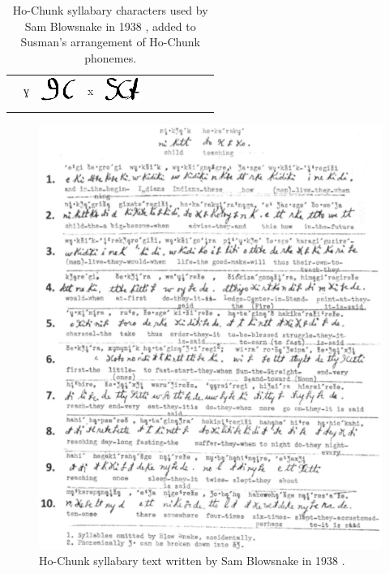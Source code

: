 \documentclass[output=paper]{LSP/langsci}
\begin{document}
\begin{table}
\begin{tabular}{lllllllllll}
& ɣ & \includegraphics{figures/Danker4gh} & x & \includegraphics{figures/Danker4x}\\
\lspbottomrule
\end{tabular}
\caption{Ho-Chunk syllabary characters used by Sam Blowsnake in 1938 \citep{Susman1939}, added to Susman's \citeyearpar[15]{Susman1943} arrangement of Ho-Chunk phonemes.}
\label{blowsnakesyllabary}
\end{table}

\begin{figure}
\includegraphics[width=1\textwidth]{figures/DankerBlowsnakeText}
\caption{Ho-Chunk syllabary text written by Sam Blowsnake in 1938 \citep{Susman1939}.}
\label{blowsnaketext}
\end{figure}
\end{document}
